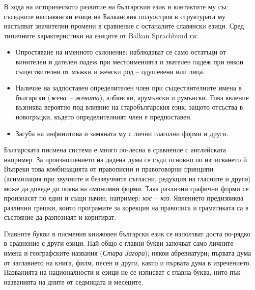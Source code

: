 \documentclass[]{../../metanetpaper}
\begin{document}
\begin{multicols}{2}
В хода на историческото развитие на българския език и
 контактите му със съседните неславянски езици на Балканския полуостров в структурата му настъпват значителни промени в сравнение с останалите славянски
 езици. Сред типичните характеристики на езиците от
 Balkan Sprachbund са:

\begin{itemize}
\item Опростяване на именното склонение: наблюдават се
 само остатъци от винителен и дателен падеж при
 местоименията и звателен падеж при някои съществителни от мъжки и женски род – одушевени
 или лица.

\item Наличие на задпоставен определителен член при съществителните имена в български ({\it жена – жената}),
 албански, арумънски и румънски. Това явление възниква вероятно под влияние на старобългарския език,
 защото отсъства в новогръцки, където определителният член е предпоставен.

\item Загуба на инфинитива и замяната му с лични
глаголни форми и други. 
\end{itemize}


Българската писмена система е много по-лесна в сравнение с
 английската например.
 За произношението на дадена дума се съди основно по изписването
 й. Въпреки това комбинацията от правописни и
 правоговорни принципи (асимилация при звучните и
 беззвучните съгласни, редукция на гласните и други)
 може да доведе до поява на омонимни форми. Така различни графични форми се произнасят
 по един и същи начин, например:
\textit{кос -- коз}. Явлението предизвиква различни
 грешки, които програмите за корекция на правописа и
граматиката са в състояние да разпознаят и коригират.

Главните букви в писмения книжовен български език се използват доста по-рядко в сравнение с други езици. Най-общо с главни букви започват само личните имена и географските названия
 ({\it Стара Загора}); някои абревиатури; първата дума от
 заглавието на книга, филм, песен и други, както и първата дума в 
изречението. Названията на
 националности и езици не се изписват с главна буква,
 нито пък названията на дните от
 седмицата и месеците.



\end{multicols}
\end{document}
